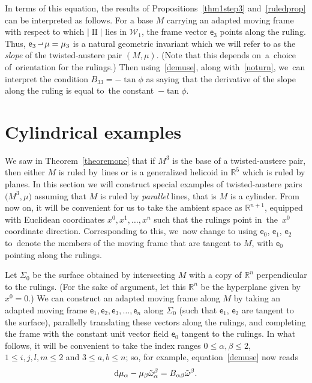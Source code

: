 \documentclass[10pt,a4paper]{amsart}
\def\R{\mathbb{R}}
\def\ve{\mathsf{e}}
\def\II{\operatorname{II}} %
\def\W{\mathscr{W}}
\def\wt{\tilde\omega}
\newcommand{\intprod}{\mathbin{\raisebox{.4ex}{\hbox{\vrule height .5pt width 5pt depth 0pt \vrule height 3pt width .5pt depth 0pt}}}}
\numberwithin{equation}{section}
\begin{document}
In terms of this equation, the results of Propositions~\ref{thm1step3} and~\ref{ruledprop} can be interpreted as follows. For a base $M$ carrying an adapted moving frame with respect to which $|\II|$ lies in $\W_1$, the frame vector $\ve_3$ points along the ruling. Thus, $\ve_3 \intprod \mu = \mu_3$ is a natural geometric invariant which we will refer to as the \emph{slope} of the twisted-austere pair $(M,\mu)$. (Note that this depends on~a~choice of~orientation for the rulings.) Then using~\eqref{demuse}, along with~\eqref{noturn}, we~can interpret the condition $B_{33}=-\tan\phi$ as saying that the derivative of the slope along the ruling is equal to~the constant~$-\tan\phi$.


\section{Cylindrical examples} \label{cylindersec}

We saw in Theorem~\ref{theoremone} that if $M^3$ is the base of a twisted-austere pair, then either $M$ is ruled by~lines or is a generalized helicoid in $\R^5$ which is ruled by planes. In this section we will construct special examples of twisted-austere pairs $\big(M^3, \mu\big)$ assuming that $M$ is ruled by \emph{parallel} lines, that is $M$ is a cylinder. From now on, it will be convenient for us to take the ambient space as $\R^{n+1}$, equipped with Euclidean coordinates $x^0, x^1, \dots, x^n$ such that the rulings point in~the~$x^0$ coordinate direction. Corresponding to this, we~now change to using $\ve_0$, $\ve_1$, $\ve_2$ to~denote the members of the moving frame that are tangent to $M$, with $\ve_0$ pointing along the rulings.

Let $\Sigma_0$ be the surface obtained by intersecting $M$ with a copy of $\R^{n}$ perpendicular to the rulings. (For the sake of argument, let this $\R^{n}$ be the hyperplane given by $x^0=0$.) We can construct an adapted moving frame along $M$ by taking an adapted moving frame $\ve_1, \ve_2, \ve_3, \dots, \ve_n$ along $\Sigma_0$ (such that $\ve_1$, $\ve_2$ are tangent to the surface), parallelly translating these vectors along the rulings, and completing the frame with the constant unit vector field $\ve_0$ tangent to the rulings. In what follows, it will be convenient to take the index ranges $0 \le \alpha,\beta \le 2$, $1 \le i,j,l,m \le 2$ and $3 \le a,b \le n$; so, for example, equation~\eqref{demuse} now reads
\begin{gather} \label{demusea}
{\rm d}\mu_\alpha - \mu_\beta\wt^\beta_\alpha = B_{\alpha\beta} \wt^\beta.
\end{gather}
\end{document}
